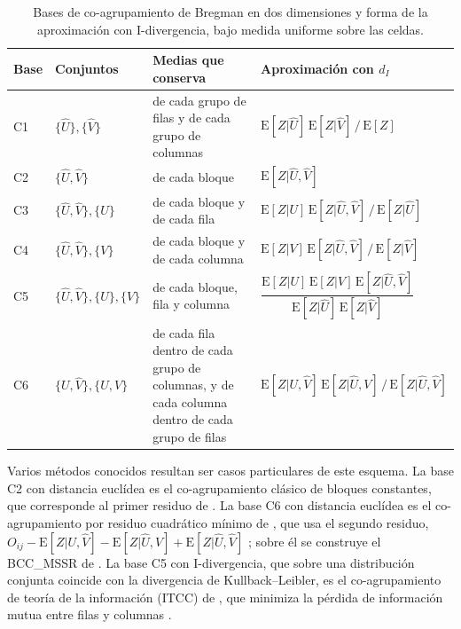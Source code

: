 \begin{table}[ht]
  \centering
  {\footnotesize
  \begin{tabular}{@{}l p{} p{} p{}@{}}
    \toprule
    \textbf{Base} & \textbf{Conjuntos} & \textbf{Medias que conserva} & \textbf{Aproximación con $d_I$} \\
    \midrule
    C1 & $\{\hat{U}\}, \{\hat{V}\}$ & de cada grupo de filas y de cada grupo de columnas &
      $\mathrm{E}[Z|\hat{U}]\,\mathrm{E}[Z|\hat{V}] \,/\, \mathrm{E}[Z]$ \\
    C2 & $\{\hat{U}, \hat{V}\}$ & de cada bloque &
      $\mathrm{E}[Z|\hat{U},\hat{V}]$ \\
    C3 & $\{\hat{U}, \hat{V}\}, \{U\}$ & de cada bloque y de cada fila &
      $\mathrm{E}[Z|U]\,\mathrm{E}[Z|\hat{U},\hat{V}] \,/\, \mathrm{E}[Z|\hat{U}]$ \\
    C4 & $\{\hat{U}, \hat{V}\}, \{V\}$ & de cada bloque y de cada columna &
      $\mathrm{E}[Z|V]\,\mathrm{E}[Z|\hat{U},\hat{V}] \,/\, \mathrm{E}[Z|\hat{V}]$ \\
    C5 & $\{\hat{U}, \hat{V}\}, \{U\}, \{V\}$ & de cada bloque, fila y columna &
      $\dfrac{\mathrm{E}[Z|U]\,\mathrm{E}[Z|V]\,\mathrm{E}[Z|\hat{U},\hat{V}]}{\mathrm{E}[Z|\hat{U}]\,\mathrm{E}[Z|\hat{V}]}$ \\
    C6 & $\{U, \hat{V}\}, \{\hat{U}, V\}$ & de cada fila dentro de cada grupo de columnas, y de cada columna dentro de cada grupo de filas &
      $\mathrm{E}[Z|U,\hat{V}]\,\mathrm{E}[Z|\hat{U},V] \,/\, \mathrm{E}[Z|\hat{U},\hat{V}]$ \\
    \bottomrule
  \end{tabular}
  }
  \caption{Bases de co-agrupamiento de Bregman en dos dimensiones
  \cite{Banerjee2007} y forma de la aproximación con I-divergencia, bajo medida
  uniforme sobre las celdas.}
  \label{tab:bases}
\end{table}

Varios métodos conocidos resultan ser casos particulares de este esquema. La base
C2 con distancia euclídea es el co-agrupamiento clásico de bloques constantes, que
corresponde al primer residuo de \cite{Cho2004}. La base C6 con distancia euclídea
es el co-agrupamiento por residuo cuadrático mínimo de \cite{Cho2004}, que usa el
segundo residuo, $O_{ij} - \mathrm{E}[Z|U,\hat{V}] - \mathrm{E}[Z|\hat{U},V] +
\mathrm{E}[Z|\hat{U},\hat{V}]$ \cite[Ejemplo~2.F]{Banerjee2007}; sobre él se
construye el BCC\_MSSR de \cite{Wu2022}. La base C5 con I-divergencia, que sobre
una distribución conjunta coincide con la divergencia de Kullback--Leibler, es el
co-agrupamiento de teoría de la información (ITCC) de \cite{Dhillon2003}, que
minimiza la pérdida de información mutua entre filas y columnas
\cite[Ejemplo~1.F]{Banerjee2007}.

